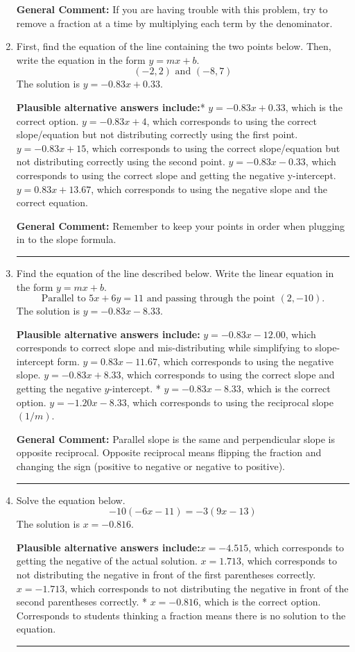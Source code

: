 \documentclass{extbook}[14pt]
\newcommand{\litem}[1]{\item #1

\rule{\textwidth}{0.4pt}}
\begin{document}
\begin{enumerate}
{\textbf{General Comment:} If you are having trouble with this problem, try to remove a fraction at a time by multiplying each term by the denominator.
}
\litem{
First, find the equation of the line containing the two points below. Then, write the equation in the form $ y=mx+b $.
\[ (-2, 2) \text{ and } (-8, 7) \]The solution is \( y = -0.83x + 0.33 \).\begin{enumerate}[label=\Alph*.]
\textbf{Plausible alternative answers include:}* $y = -0.83x + 0.33$, which is the correct option.
 $y = -0.83x + 4$, which corresponds to using the correct slope/equation but not distributing correctly using the first point.
 $y = -0.83x + 15$, which corresponds to using the correct slope/equation but not distributing correctly using the second point.
 $y = -0.83x -0.33$, which corresponds to using the correct slope and getting the negative y-intercept.
 $y = 0.83x + 13.67$, which corresponds to using the negative slope and the correct equation.
\end{enumerate}

\textbf{General Comment:} Remember to keep your points in order when plugging in to the slope formula.
}
\litem{
Find the equation of the line described below. Write the linear equation in the form $y=mx+b$.
\[ \text{Parallel to } 5 x + 6 y = 11 \text{ and passing through the point } (2, -10). \]The solution is \( y = -0.83x - 8.33 \).\begin{enumerate}[label=\Alph*.]
\textbf{Plausible alternative answers include:} $y = -0.83x - 12.00$, which corresponds to correct slope and mis-distributing while simplifying to slope-intercept form.
 $y = 0.83x - 11.67$, which corresponds to using the negative slope.
 $y = -0.83x + 8.33$, which corresponds to using the correct slope and getting the negative $y$-intercept.
* $y = -0.83x - 8.33$, which is the correct option.
 $y = -1.20x - 8.33$, which corresponds to using the reciprocal slope $(1/m)$.
\end{enumerate}

\textbf{General Comment:} Parallel slope is the same and perpendicular slope is opposite reciprocal. Opposite reciprocal means flipping the fraction and changing the sign (positive to negative or negative to positive).
}
\litem{
Solve the equation below.
\[ -10(-6x -11) = -3(9x -13) \]The solution is \( x = -0.816 \).\begin{enumerate}[label=\Alph*.]
\textbf{Plausible alternative answers include:}$x = -4.515$, which corresponds to getting the negative of the actual solution.
$x = 1.713$, which corresponds to not distributing the negative in front of the first parentheses correctly.
$x = -1.713$, which corresponds to not distributing the negative in front of the second parentheses correctly.
* $x = -0.816$, which is the correct option.
Corresponds to students thinking a fraction means there is no solution to the equation.
\end{enumerate}

}
\end{enumerate}
\end{document}
